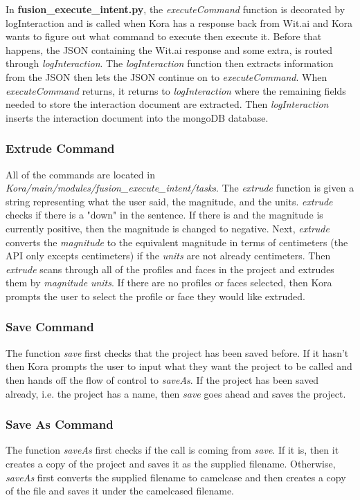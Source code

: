 \documentclass[onecolumn, draftclsnofoot,10pt, compsoc]{IEEEtran}
\begin{document}
In \textbf{fusion\_execute\_intent.py}, the \textit{executeCommand} function is decorated by logInteraction and is called when Kora has a response back from Wit.ai and Kora wants to figure out what command to execute then execute it. Before that happens, the JSON containing the Wit.ai response and some extra, is routed through \textit{logInteraction}. The \textit{logInteraction} function then extracts information from the JSON then lets the JSON continue on to \textit{executeCommand}. When \textit{executeCommand} returns, it returns to \textit{logInteraction} where the remaining fields needed to store the interaction document are extracted.
Then \textit{logInteraction} inserts the interaction document into the mongoDB database.

\subsubsection{Extrude Command}
All of the commands are located in \textit{Kora/main/modules/fusion\_execute\_intent/tasks}. The \textit{extrude} function is given a string representing what the user said, the magnitude, and the units.
\textit{extrude} checks if there is a "down" in the sentence. If there is and the magnitude is currently positive, then the magnitude is changed to negative. Next, \textit{extrude} converts the \textit{magnitude} to the equivalent magnitude in terms of centimeters (the API only excepts centimeters) if the \textit{units} are not already centimeters.
Then \textit{extrude} scans through all of the profiles and faces in the project and extrudes them by \textit{magnitude} \textit{units}. If there are no profiles or faces selected, then Kora prompts the user to select the profile or face they would like extruded.

\subsubsection{Save Command}
The function \textit{save} first checks that the project has been saved before. If it hasn't then Kora prompts the user to input what they want the project to be called and then hands off the flow of control to \textit{saveAs}. If the project has been saved already, i.e. the project has a name, then \textit{save} goes ahead and saves the project.

\subsubsection{Save As Command}
The function \textit{saveAs} first checks if the call is coming from \textit{save}. If it is, then it creates a copy of the project and saves it as the supplied filename. Otherwise, \textit{saveAs} first converts the supplied filename to camelcase and then creates a copy of the file and saves it under the camelcased filename.
\end{document}
